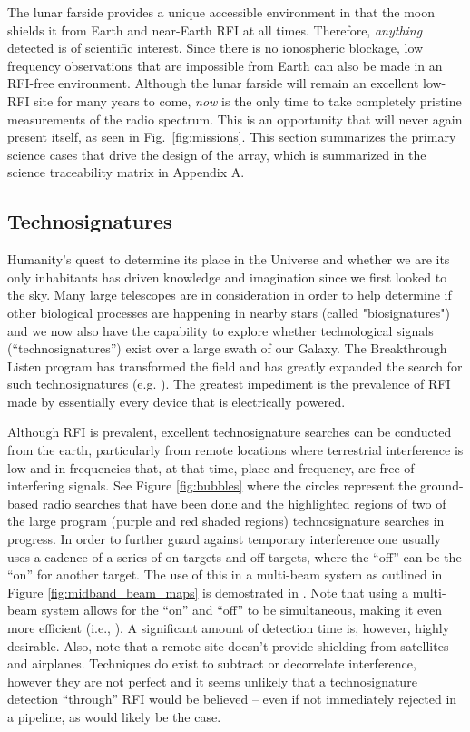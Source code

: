 The lunar farside provides a unique accessible environment in that the moon shields it from Earth and near-Earth RFI at all times. Therefore, {\em anything} detected is of scientific interest. Since there is no ionospheric blockage, low frequency observations that are impossible from Earth can also be made in an RFI-free environment. Although the lunar farside will remain an excellent low-RFI site for many years to come, {\em now} is the only time to take completely pristine measurements of the radio spectrum. This is an opportunity that will never again present itself, as seen in Fig.\ \ref{fig:missions}.  This section summarizes the primary science cases that drive the design of the array, which is summarized in the science traceability matrix in Appendix A.

\subsection{Technosignatures}
Humanity's quest to determine its place in the Universe and whether we are its only inhabitants has driven knowledge and imagination since we first looked to the sky.  Many large telescopes are in consideration in order to help determine if other biological processes are happening in nearby stars (called "biosignatures") and we now also have the capability to explore whether technological signals (``technosignatures'') exist over a large swath of our Galaxy.  The Breakthrough Listen program has transformed the field and has greatly expanded the search for such technosignatures (e.g. \citealt{Enriquez_2017, Price_2020, Gajjar_2021}).  The greatest impediment is the prevalence of RFI made by essentially every device that is electrically powered.

Although RFI is prevalent, excellent technosignature searches can be conducted from the earth, particularly from remote locations where terrestrial interference is low and in frequencies that, at that time, place and frequency, are free of interfering signals. See Figure \ref{fig:bubbles} where the circles represent the ground-based radio searches that have been done and the highlighted regions of two of the large program (purple and red shaded regions) technosignature searches in progress. In order to further guard against temporary interference one usually uses a cadence of a series of on-targets and off-targets, where the ``off'' can be the ``on'' for another target. The use of this in a multi-beam system as outlined in Figure \ref{fig:midband_beam_maps} is demostrated in \cite{Huang_2023}. Note that using a multi-beam system allows for the ``on'' and ``off'' to be simultaneous, making it even more efficient (i.e., \citealt{multibeam}). A significant amount of detection time is, however, highly desirable. Also, note that a remote site doesn't provide shielding from satellites and airplanes. Techniques do exist to subtract or decorrelate interference, however they are not perfect and it seems unlikely that a technosignature detection ``through'' RFI would be believed -- even if not immediately rejected in a pipeline, as would likely be the case.

